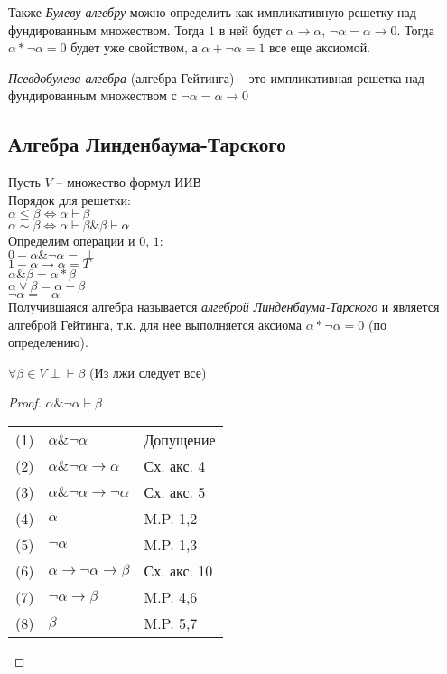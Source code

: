 Также \emph{Булеву алгебру} можно определить как импликативную решетку над фундированным множеством. Тогда $1$ в ней будет $\alpha \rightarrow \alpha$, $\neg \alpha = \alpha \rightarrow 0$. Тогда $\alpha * \neg \alpha = 0$ будет уже свойством, а $\alpha + \neg \alpha = 1$ все еще аксиомой.

\emph{Псевдобулева алгебра} (алгебра Гейтинга) -- это импликативная решетка над фундированным множеством с $\neg \alpha = \alpha \rightarrow 0$

\subsection{Алгебра Линденбаума-Тарского}
\label{sec-5-5}
Пусть $V$ -- множество формул ИИВ\\
Порядок для решетки:\\
$\alpha \leq \beta \Leftrightarrow  \alpha \vdash \beta$\\
$\alpha \sim \beta \Leftrightarrow \alpha \vdash \beta \& \beta \vdash \alpha$\\
Определим операции и $0$, $1$:\\
$0 - \alpha \& \neg \alpha = \perp$\\
$1 - \alpha \rightarrow \alpha = T$\\
$\alpha \& \beta = \alpha * \beta$\\
$\alpha \vee \beta = \alpha + \beta$\\
$\neg \alpha = -\alpha$\\
Получившаяся алгебра называется \emph{алгеброй Линденбаума-Тарского} и является алгеброй Гейтинга, т.к. для нее выполняется аксиома $\alpha * \neg \alpha = 0$ (по определению).
\begin{lemma}
$\forall \beta \in V \perp \vdash \beta$ (Из лжи следует все)
\end{lemma}
\begin{proof}
$\alpha \& \neg \alpha \vdash \beta$\\
\begin{tabular}{lll}
(1) &$\alpha \& \neg \alpha$& Допущение\\
(2) &$\alpha \& \neg \alpha \rightarrow \alpha$& Сх. акс. 4\\
(3) &$\alpha \& \neg \alpha \rightarrow \neg \alpha$& Сх. акс. 5\\
(4) &$\alpha$& M.P. 1,2\\
(5) &$\neg \alpha$& M.P. 1,3\\
(6) &$\alpha \rightarrow \neg \alpha \rightarrow \beta$& Сх. акс. 10\\
(7) & $\neg \alpha \rightarrow \beta$& M.P. 4,6\\
(8) & $\beta$& M.P. 5,7\\
\end{tabular}
\end{proof}
